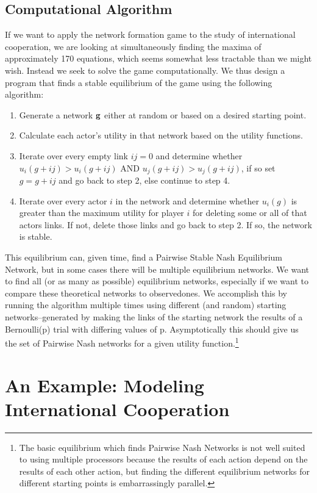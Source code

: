 \documentclass[12pt,onesided,fullpage]{amsart}
\begin{document}
\subsection{Computational Algorithm}
If we want to apply the network formation game to the study of international cooperation, we are looking at simultaneously finding the maxima of approximately 170 equations, which seems somewhat less tractable than we might wish. Instead we seek to solve the game computationally. We thus design a program that finds a stable equilibrium of the game using the following algorithm:
\begin{enumerate}
\item Generate a network $\bf{g}$ either at random or based on a desired starting point. 
\item Calculate each actor's utility in that network based on the utility functions.
\item Iterate over every empty link $ij = 0$ and determine whether \\ $u_{i}(g+ij) > u_{i}(g+ij)  \text{ AND } u_{j}(g+ij) > u_{j}(g+ij)$, if so set $g = g + ij$ and go back to step 2, else continue to step 4.
\item Iterate over every actor $i$ in the network and determine whether $u_{i}(g)$ is greater than the maximum utility for player $i$ for deleting some or all of that actors links. If not, delete those links and go back to step 2. If so, the network is stable.
\end{enumerate}

This equilibrium can, given time, find a Pairwise Stable Nash Equilibrium Network, but in some cases there will be multiple equilibrium networks. We want to find all (or as many as possible) equilibrium networks, especially if we want to compare these theoretical networks to observedones. We accomplish this by running the algorithm multiple times using different (and random) starting networks--generated by making the links of the starting network the results of a Bernoulli(p) trial with differing values of p. Asymptotically this should give us the set of Pairwise Nash networks for a given utility function.\footnote{The basic equilibrium which finds Pairwise Nash Networks is not well suited to using multiple processors because the results of each action depend on the results of each other action, but finding the different equilibrium networks for different starting points is embarrassingly parallel.}
\section{An Example: Modeling International Cooperation}
\end{document}
